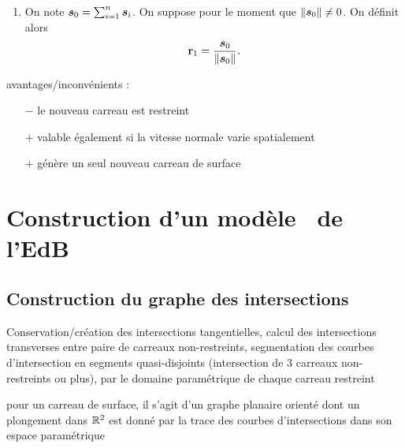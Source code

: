\begin{enumerate}
	\item On note $\bm{s}_{0} = \sum_{i = 1}^n \bm{s}_i$. 
	On suppose pour le moment que $\left\| {\bm{s}_{0}} \right\| \neq 0$. 
	On définit alors 
	\begin{equation}
	    \mathbf{r}_1 = \frac{ \bm{s}_{0} }{\left\| { \bm{s}_{0} } \right\|}.
	\end{equation}
\end{enumerate}	

avantages/inconvénients :
\begin{itemize}
	\item[$-$] le nouveau carreau est restreint
	\item[$+$] valable également si la vitesse normale varie spatialement
	\item[$+$] génère un seul nouveau carreau de surface
\end{itemize}





\section{Construction d'un modèle \brep\ de l'EdB}

\subsection{Construction du graphe des intersections}
Conservation/création des intersections tangentielles, calcul des intersections transverses entre paire de carreaux non-restreints, segmentation des courbes d'intersection en segments quasi-disjoints (intersection de 3 carreaux non-restreints ou plus),  par le domaine paramétrique de chaque carreau restreint
\par\bigskip
pour un carreau de surface, il s'agit d'un graphe planaire orienté dont un plongement dans $\mathbb{R}^2$ est donné par la trace des courbes d'intersections dans son espace paramétrique

